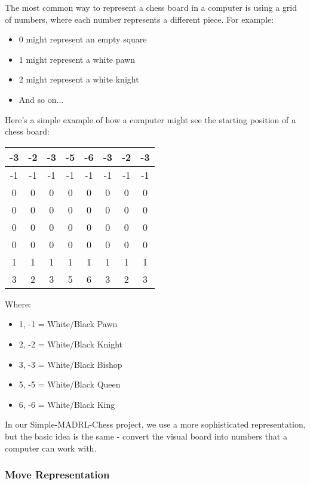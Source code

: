 \documentclass[11pt]{article}
\begin{document}
The most common way to represent a chess board in a computer is using a grid of numbers, where each number represents a different piece. For example:
\begin{itemize}
    \item 0 might represent an empty square
    \item 1 might represent a white pawn
    \item 2 might represent a white knight
    \item And so on...
\end{itemize}

Here's a simple example of how a computer might see the starting position of a chess board:

\begin{center}
\begin{tabular}{|c|c|c|c|c|c|c|c|}
\hline
-3 & -2 & -3 & -5 & -6 & -3 & -2 & -3 \\
\hline
-1 & -1 & -1 & -1 & -1 & -1 & -1 & -1 \\
\hline
0 & 0 & 0 & 0 & 0 & 0 & 0 & 0 \\
\hline
0 & 0 & 0 & 0 & 0 & 0 & 0 & 0 \\
\hline
0 & 0 & 0 & 0 & 0 & 0 & 0 & 0 \\
\hline
0 & 0 & 0 & 0 & 0 & 0 & 0 & 0 \\
\hline
1 & 1 & 1 & 1 & 1 & 1 & 1 & 1 \\
\hline
3 & 2 & 3 & 5 & 6 & 3 & 2 & 3 \\
\hline
\end{tabular}
\end{center}

Where:
\begin{itemize}
    \item 1, -1 = White/Black Pawn
    \item 2, -2 = White/Black Knight
    \item 3, -3 = White/Black Bishop
    \item 5, -5 = White/Black Queen
    \item 6, -6 = White/Black King
\end{itemize}

In our Simple-MADRL-Chess project, we use a more sophisticated representation, but the basic idea is the same - convert the visual board into numbers that a computer can work with.

\subsubsection{Move Representation}
\end{document}
